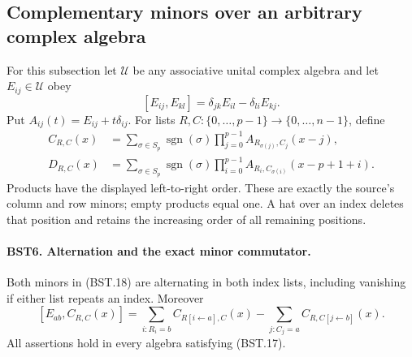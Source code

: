 \documentclass[11pt,a4paper]{article}
\numberwithin{equation}{section}
\theoremstyle{remark}\newtheorem{remark}[theorem]{Remark}
\begin{document}
\subsection{Complementary minors over an arbitrary complex algebra}

For this subsection let $\mathcal U$ be any associative unital complex
algebra and let $E_{ij}\in\mathcal U$ obey
\[
 [E_{ij},E_{kl}]=\delta_{jk}E_{il}-\delta_{li}E_{kj}.
 \tag{BST.17}
\]
Put $A_{ij}(t)=E_{ij}+t\delta_{ij}$.  For lists
$R,C:\{0,\ldots,p-1\}\to\{0,\ldots,n-1\}$, define
\[
 \begin{split}
 C_{R,C}(x)
  &=\sum_{\sigma\in S_p}\operatorname{sgn}(\sigma)
       \prod_{j=0}^{p-1}A_{R_{\sigma(j)},C_j}(x-j),\\
 D_{R,C}(x)
  &=\sum_{\sigma\in S_p}\operatorname{sgn}(\sigma)
       \prod_{i=0}^{p-1}A_{R_i,C_{\sigma(i)}}(x-p+1+i).
 \end{split}
 \tag{BST.18}
\]
Products have the displayed left-to-right order.  These are exactly
the source's column and row minors; empty products equal one.
A hat over an index deletes that position and retains the increasing
order of all remaining positions.

\paragraph{BST6. Alternation and the exact minor commutator.}
\label{claim:BST6}
Both minors in (BST.18) are alternating in both index lists, including
vanishing if either list repeats an index.  Moreover
\[
 [E_{ab},C_{R,C}(x)]
 =\sum_{i:R_i=b}C_{R[i\leftarrow a],C}(x)
  -\sum_{j:C_j=a}C_{R,C[j\leftarrow b]}(x).
 \tag{BST.19}
\]
All assertions hold in every algebra satisfying (BST.17).
\end{document}
